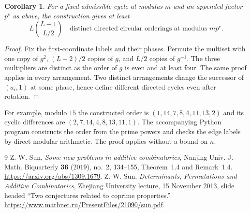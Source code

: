 \documentclass[11pt]{article}
\newtheorem{corollary}[theorem]{Corollary}
\begin{document}
\begin{corollary}
For a fixed admissible cycle at modulus $m$ and an appended factor $p^e$ as above, the construction gives at least
\[ L\binom{L-1}{L/2}\quad\text{distinct directed circular orderings at modulus }mp^e.\]
\end{corollary}
\begin{proof}
Fix the first-coordinate labels and their phases. Permute the multiset with one copy of $g^2$, $(L-2)/2$ copies of $g$, and $L/2$ copies of $g^{-1}$. The three multipliers are distinct as the order of $g$ is even and at least four. The same proof applies in every arrangement. Two distinct arrangements change the successor of $(a_i,1)$ at some phase, hence define different directed cycles even after rotation.
\end{proof}

For example, modulo $15$ the constructed order is $(1,14,7,8,4,11,13,2)$ and its cyclic differences are $(2,7,14,4,8,13,11,1)$. The accompanying Python program constructs the order from the prime powers and checks the edge labels by direct modular arithmetic. The proof applies without a bound on $n$.

\begin{thebibliography}{9}
 Z.-W. Sun, \emph{Some new problems in additive combinatorics}, Nanjing Univ. J. Math. Biquarterly \textbf{36} (2019), no.~2, 134--155, Theorem~1.4 and Remark~1.4. \url{https://arxiv.org/abs/1309.1679}.
 Z.-W. Sun, \emph{Determinants, Permutations and Additive Combinatorics}, Zhejiang University lecture, 15 November 2013, slide headed ``Two conjectures related to coprime properties.'' \url{https://www.mathnet.ru/PresentFiles/21090/sun.pdf}.
\end{thebibliography}
\end{document}
